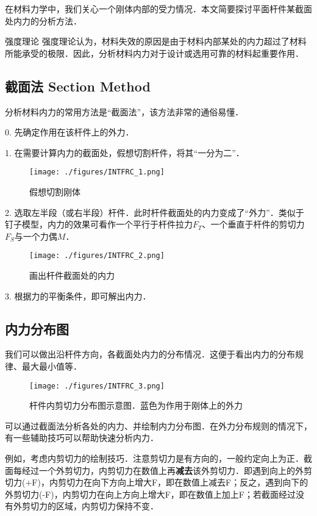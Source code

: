 
\begin{issues}
\issueNeedCite
\end{issues}


在材料力学中，我们关心一个刚体内部的受力情况．本文简要探讨平面杆件某截面处内力的分析方法．

\begin{example}{强度理论}
强度理论认为，材料失效的原因是由于材料内部某处的内力超过了材料所能承受的极限．因此，分析材料内力对于设计或选用可靠的材料起重要作用．
\end{example}

\subsection{截面法 Section Method}
分析材料内力的常用方法是“截面法”，该方法非常的通俗易懂．

0. 先确定作用在该杆件上的外力．

1. 在需要计算内力的截面处，假想切割杆件，将其“一分为二”．
\begin{figure}[ht]
\centering
\texttt{[image: ./figures/INTFRC\_1.png]}
\caption{假想切割刚体} \label{INTFRC_fig1}
\end{figure}

2. 选取左半段（或右半段）杆件．此时杆件截面处的内力变成了“外力”．类似于钉子模型，内力的效果可看作一个平行于杆件拉力$F_T$、一个垂直于杆件的剪切力$F_S$与一个力偶$M$．
\begin{figure}[ht]
\centering
\texttt{[image: ./figures/INTFRC\_2.png]}
\caption{画出杆件截面处的内力} \label{INTFRC_fig2}
\end{figure}

3. 根据力的平衡条件，即可解出内力．

\subsection{内力分布图}
我们可以做出沿杆件方向，各截面处内力的分布情况．这便于看出内力的分布规律、最大最小值等．
\begin{figure}[ht]
\centering
\texttt{[image: ./figures/INTFRC\_3.png]}
\caption{杆件内剪切力分布图示意图．蓝色为作用于刚体上的外力} \label{INTFRC_fig3}
\end{figure}

可以通过截面法分析各处的内力、并绘制内力分布图．在外力分布规则的情况下，有一些辅助技巧可以帮助快速分析内力．

例如，考虑内剪切力的绘制技巧．注意剪切力是有方向的，一般约定向上为正．截面每经过一个外剪切力，内剪切力在数值上再\textbf{减去}该外剪切力．即遇到向上的外剪切力(+F)，内剪切力在向下方向上增大F，即在数值上减去F；反之，遇到向下的外剪切力(-F)，内剪切力在向上方向上增大F，即在数值上加上F；若截面经过没有外剪切力的区域，内剪切力保持不变．
